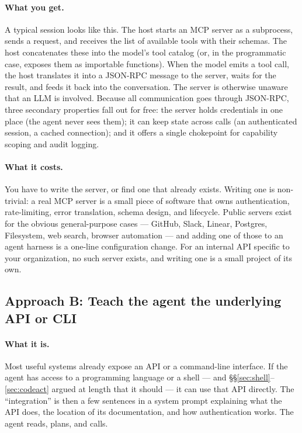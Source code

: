\paragraph{What you get.}
A typical session looks like this. The host starts an MCP server
as a subprocess, sends a  request, and receives
the list of available tools with their schemas. The host
concatenates these into the model's tool catalog (or, in the
programmatic case, exposes them as importable functions). When the
model emits a tool call, the host translates it into a
 JSON-RPC message to the server, waits for the
result, and feeds it back into the conversation. The server is
otherwise unaware that an LLM is involved. Because all
communication goes through JSON-RPC, three secondary properties
fall out for free: the server holds credentials in one place
(the agent never sees them); it can keep state across calls (an
authenticated session, a cached connection); and it offers a
single chokepoint for capability scoping and audit logging.

\paragraph{What it costs.}
You have to write the server, or find one that already exists.
Writing one is non-trivial: a real MCP server is a small piece of
software that owns authentication, rate-limiting, error
translation, schema design, and lifecycle. Public servers exist
for the obvious general-purpose cases --- GitHub, Slack, Linear,
Postgres, Filesystem, web search, browser automation --- and
adding one of those to an agent harness is a one-line
configuration change. For an internal API specific to your
organization, no such server exists, and writing one is a small
project of its own.

\subsection{Approach B: Teach the agent the underlying API or CLI}
\label{sec:mcp-api-approach}

\paragraph{What it is.}
Most useful systems already expose an API or a command-line
interface. If the agent has access to a programming language or
a shell --- and \S\S\ref{sec:shell}--\ref{sec:codeact} argued at
length that it should --- it can use that API directly. The
``integration'' is then a few sentences in a system prompt
explaining what the API does, the location of its documentation,
and how authentication works. The agent reads, plans, and calls.

